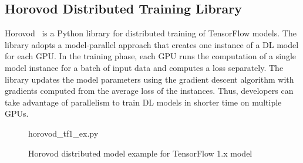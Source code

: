 \subsection{Horovod Distributed Training Library}

Horovod~\cite{sergeev2018horovod} is a Python library for distributed training 
of TensorFlow models. 
The library adopts a model-parallel approach that creates one instance of a DL
model for each GPU.
In the training phase, each GPU runs the computation of a single model instance
for a batch of input data and computes a loss separately.
The library updates the model parameters using the gradient descent algorithm
with gradients computed from the average loss of the instances.
Thus, developers can take advantage of parallelism to train DL models in
shorter time on multiple GPUs.

\begin{figure}[ht!]
 
{horovod_tf1_ex.py}
  \caption{Horovod distributed model example for TensorFlow 1.x model}
\label{fig:back:hvd1} 
\end{figure}

